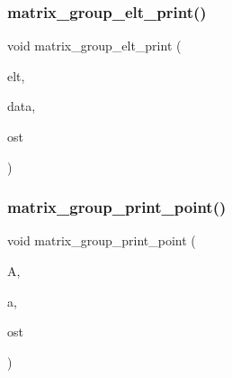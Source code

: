 \subsubsection{\texorpdfstring{matrix\+\_\+group\+\_\+elt\+\_\+print()}{matrix\_group\_elt\_print()}}
{\footnotesize\ttfamily void matrix\+\_\+group\+\_\+elt\+\_\+print (\begin{DoxyParamCaption}\item[{void $\ast$}]{elt,  }\item[{void $\ast$}]{data,  }\item[{ostream \&}]{ost }\end{DoxyParamCaption})}

\mbox{\label{interface__matrix__group_8_c_adc53d1d08096c08ec5005c90fa1d2100}} 
\subsubsection{\texorpdfstring{matrix\+\_\+group\+\_\+print\+\_\+point()}{matrix\_group\_print\_point()}}
{\footnotesize\ttfamily void matrix\+\_\+group\+\_\+print\+\_\+point (\begin{DoxyParamCaption}\item[{\mbox{\hyperlink{classaction}{action}} \&}]{A,  }\item[{\mbox{\hyperlink{galois_8h_a09fddde158a3a20bd2dcadb609de11dc}{I\+NT}}}]{a,  }\item[{ostream \&}]{ost }\end{DoxyParamCaption})}

